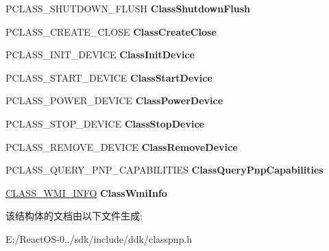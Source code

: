 \begin{DoxyCompactItemize}
\item 
\mbox{\label{struct___c_l_a_s_s___d_e_v___i_n_f_o_a5425cda46a08aac2b1bf1541f78d8b59}} 
P\+C\+L\+A\+S\+S\+\_\+\+S\+H\+U\+T\+D\+O\+W\+N\+\_\+\+F\+L\+U\+SH {\bfseries Class\+Shutdown\+Flush}
\item 
\mbox{\label{struct___c_l_a_s_s___d_e_v___i_n_f_o_acb3ce569afa47911934e2e1f88b2642d}} 
P\+C\+L\+A\+S\+S\+\_\+\+C\+R\+E\+A\+T\+E\+\_\+\+C\+L\+O\+SE {\bfseries Class\+Create\+Close}
\item 
\mbox{\label{struct___c_l_a_s_s___d_e_v___i_n_f_o_a3204a49d897e918d794e0b3137966dc6}} 
P\+C\+L\+A\+S\+S\+\_\+\+I\+N\+I\+T\+\_\+\+D\+E\+V\+I\+CE {\bfseries Class\+Init\+Device}
\item 
\mbox{\label{struct___c_l_a_s_s___d_e_v___i_n_f_o_aa34b9fd49b6749a133401f268cecb829}} 
P\+C\+L\+A\+S\+S\+\_\+\+S\+T\+A\+R\+T\+\_\+\+D\+E\+V\+I\+CE {\bfseries Class\+Start\+Device}
\item 
\mbox{\label{struct___c_l_a_s_s___d_e_v___i_n_f_o_a735a5dfc864f5ef13d8788f463f5ca7b}} 
P\+C\+L\+A\+S\+S\+\_\+\+P\+O\+W\+E\+R\+\_\+\+D\+E\+V\+I\+CE {\bfseries Class\+Power\+Device}
\item 
\mbox{\label{struct___c_l_a_s_s___d_e_v___i_n_f_o_ae5cf5bce89a35432bb665bf4d8965a9a}} 
P\+C\+L\+A\+S\+S\+\_\+\+S\+T\+O\+P\+\_\+\+D\+E\+V\+I\+CE {\bfseries Class\+Stop\+Device}
\item 
\mbox{\label{struct___c_l_a_s_s___d_e_v___i_n_f_o_a948f50ba18c1b7eaedc412812b5a38bd}} 
P\+C\+L\+A\+S\+S\+\_\+\+R\+E\+M\+O\+V\+E\+\_\+\+D\+E\+V\+I\+CE {\bfseries Class\+Remove\+Device}
\item 
\mbox{\label{struct___c_l_a_s_s___d_e_v___i_n_f_o_a3daa746a29bb4219b4b5f46d1cd374a3}} 
P\+C\+L\+A\+S\+S\+\_\+\+Q\+U\+E\+R\+Y\+\_\+\+P\+N\+P\+\_\+\+C\+A\+P\+A\+B\+I\+L\+I\+T\+I\+ES {\bfseries Class\+Query\+Pnp\+Capabilities}
\item 
\mbox{\label{struct___c_l_a_s_s___d_e_v___i_n_f_o_afe877e01958b10c942664b301899232e}} 
\hyperlink{struct___c_l_a_s_s___w_m_i___i_n_f_o}{C\+L\+A\+S\+S\+\_\+\+W\+M\+I\+\_\+\+I\+N\+FO} {\bfseries Class\+Wmi\+Info}
\end{DoxyCompactItemize}


该结构体的文档由以下文件生成\+:\begin{DoxyCompactItemize}
\item 
E\+:/\+React\+O\+S-\/0../sdk/include/ddk/classpnp.\+h\end{DoxyCompactItemize}
